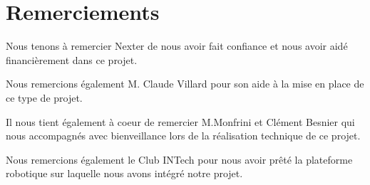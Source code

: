 \section*{Remerciements}

\tab Nous tenons à remercier Nexter de nous avoir fait confiance et nous avoir aidé financièrement dans ce projet. 

\tab Nous remercions également M. Claude Villard pour son aide à la mise en place de ce type de projet.

\tab Il nous tient également à coeur de remercier M.Monfrini et Clément Besnier qui nous accompagnés avec bienveillance lors de la réalisation technique de ce projet.

\tab Nous remercions également le Club INTech pour nous avoir prêté la plateforme robotique sur laquelle nous avons intégré notre projet.